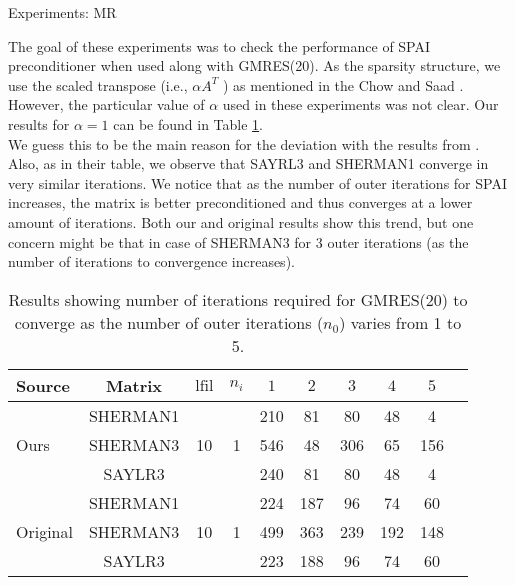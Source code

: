 \documentclass[paper=A4, fontsize=11pt]{scrartcl}
\theoremstyle{remark}
\begin{document}
\begin{section}{Experiments: MR}

The goal of these experiments was to check the performance of SPAI preconditioner when used along with GMRES(20).	As the sparsity structure, we use the scaled transpose (i.e., $\alpha A^{T}$ ) as mentioned in the Chow and Saad \cite{chow}. However, the particular value of $\alpha$ used in these experiments was not clear. Our results for $\alpha =1 $ can be found in Table \ref{tab:chow}. \\

We guess this to be the main reason for the deviation with the results from \cite{chow}. Also, as in their table, we observe that SAYRL3 and SHERMAN1 converge in very similar iterations.  We notice that as the number of outer iterations for SPAI increases, the matrix is better preconditioned and thus converges at a lower amount of iterations. Both our and original results show this trend, but one concern might be that in case of SHERMAN3 for 3 outer iterations (as the number of iterations to convergence increases). \newline

\begin{table}[h]
	\centering
\begin{tabular}{@{}lc|cc|cccccc@{}}
	\toprule
	Source & Matrix &    $\text{lfil}$ &  $n_{i}$ &   $1$ &  $2$ &  $3$ & $4$ &  $5$ \\ \midrule
	\multirow{3}{*}{Ours} & SHERMAN1 & \multirow{3}{*}{10} & \multirow{3}{*}{1}  & 210 & 81 & 80 & 48 & 4  \\
	
	& SHERMAN3 &  &  & 546 & 48 & 306 & 65 & 156  \\

	& SAYLR3 & & & 240 & 81 & 80 & 48 & 4  \\
		\midrule
	\multirow{3}{*}{Original} & SHERMAN1 & \multirow{3}{*}{10} & \multirow{3}{*}{1} & 224 & 187 & 96 & 74 & 60  \\

& SHERMAN3 &  &  & 499 & 363 & 239 & 192 & 148  \\

& SAYLR3 & & & 223 & 188 & 96 & 74 & 60  \\
	\bottomrule
	\end{tabular}
	\caption{Results showing number of iterations required for GMRES(20) to converge as the number of outer iterations ($n_0$) varies from 1 to 5.}
\label{tab:chow}
\end{table}


\end{section}
\end{document}

